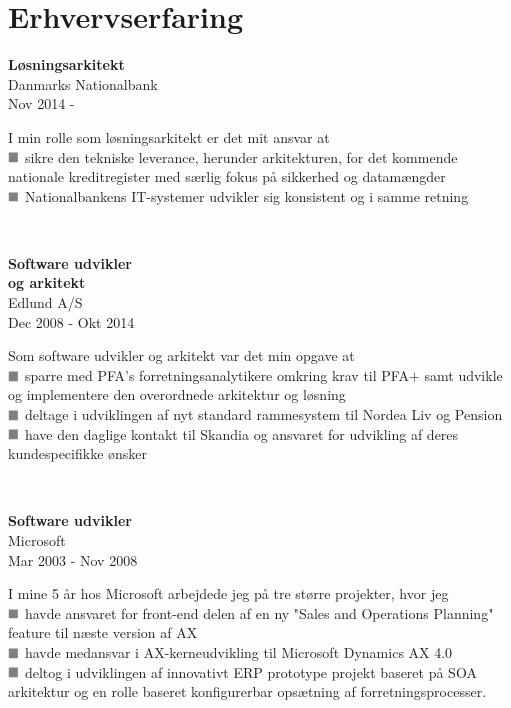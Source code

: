 \documentclass[10pt, a4paper]{article}
\newcommand*{\greysquare}{\textcolor{gray}{\blacksquare}}
\begin{document}
\section{Erhvervserfaring}
\begin{Row}%
  \begin{Cell}{1}
    \textbf{Løsningsarkitekt} \\ [1ex]
    Danmarks Nationalbank \\ 
    Nov 2014 -   
  \end{Cell}
  \begin{Cell}{3}
    I min rolle som løsningsarkitekt er det mit ansvar at \\ [1ex]
    $\greysquare$ sikre den tekniske leverance, herunder arkitekturen, for det kommende nationale kreditregister med særlig fokus på sikkerhed og datamængder \\
    $\greysquare$ Nationalbankens IT-systemer udvikler sig konsistent og i samme retning
  \end{Cell}
\end{Row}
\\[0.5cm]
\begin{Row}
  \begin{Cell}{1}
    \textbf{Software udvikler \\ 
    og arkitekt} \\ [1ex]
    Edlund A/S \\ 
    Dec 2008 - Okt 2014  
  \end{Cell}
  \begin{Cell}{3}
    Som software udvikler og arkitekt var det min opgave at \\ [1ex]
    $\greysquare$ sparre med PFA's forretningsanalytikere omkring krav til PFA$+$ samt udvikle og implementere den overordnede arkitektur og løsning \\
    $\greysquare$ deltage i udviklingen af nyt standard rammesystem til Nordea Liv og Pension \\
    $\greysquare$ have den daglige kontakt til Skandia og ansvaret for udvikling af deres kundespecifikke ønsker
  \end{Cell}
\end{Row}
\\[0.5cm]
\begin{Row}%
  \begin{Cell}{1}
    \textbf{Software udvikler} \\ [1ex]
    Microsoft \\ 
    Mar 2003 - Nov 2008  
  \end{Cell}
  \begin{Cell}{3}
    I mine 5 år hos Microsoft arbejdede jeg på tre større projekter, hvor jeg \\ [1ex]
    $\greysquare$ havde ansvaret for front-end delen af en ny "Sales and Operations Planning" feature til næste version af AX \\
    $\greysquare$ havde medansvar i AX-kerneudvikling til Microsoft Dynamics AX 4.0 \\
    $\greysquare$ deltog i udviklingen af innovativt ERP prototype projekt baseret på SOA arkitektur og en rolle baseret konfigurerbar opsætning af forretningsprocesser. 
  \end{Cell}
\end{Row}
\end{document}
